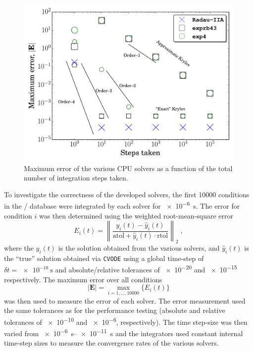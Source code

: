 \documentclass[preprint]{elsarticle}
\begin{document}
\begin{figure}[htb]
  \centering
  \includegraphics[width=0.7\linewidth]{c_nco_nosmem_error.pdf}
  \caption{Maximum error of the various CPU solvers as a function of the total number of integration steps taken.}
  \label{F:convergence}
 \end{figure}

To investigate the correctness of the developed solvers, the first \num{10000} conditions in the \slash{} database were integrated by each solver for \SI{e-6}{\second}.
The error for condition $i$ was then determined using the weighted root-mean-square error
\begin{equation}
 E_i(t) = \left\lVert\frac{y_i(t) - \hat{y}_i(t)}{\text{atol} + \hat{y}_i(t) \cdot \text{rtol}}\right\rVert_2 \;,
\end{equation}
where the $y_i(t)$ is the solution obtained from the various solvers, and $\hat{y}_i(t)$ is the ``true'' solution obtained via \texttt{CVODE} using a global time-step of $\delta t = \SI{e-10}{\second}$ and absolute\slash relative tolerances of \num{e-20} and \num{e-15} respectively.
The maximum error over all conditions
\begin{equation}
 \left\lvert\textbf{E}\right\rvert = \max_{i= 1, \dots, \num{10000}}\{E_i(t)\}
\end{equation}
was then used to measure the error of each solver.
The error measurement used the same tolerances as for the performance testing (absolute and relative tolerances of \num{e-10} and \num{e-6}, respectively).
The time step-size was then varied from \SIrange{e-6}{e-11}{\second} and the integrators used constant internal time-step sizes to measure the convergence rates of the various solvers.
\end{document}
